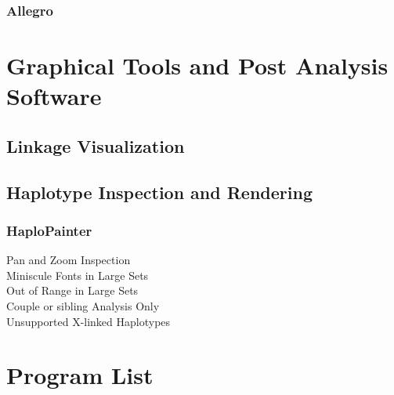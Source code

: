 \subsubsection{Allegro}


\section{Graphical Tools and Post Analysis Software}
\subsection{Linkage Visualization}
\subsection{Haplotype Inspection and Rendering}
\subsubsection{HaploPainter}
\begin{description}
\item[Pan and Zoom Inspection]{}
\item[Miniscule Fonts in Large Sets]{}
\item[Out of Range in Large Sets]{}
\item[Couple or sibling Analysis Only]{}
\item[Unsupported X-linked Haplotypes]{}
\end{description}

\section{Program List}

